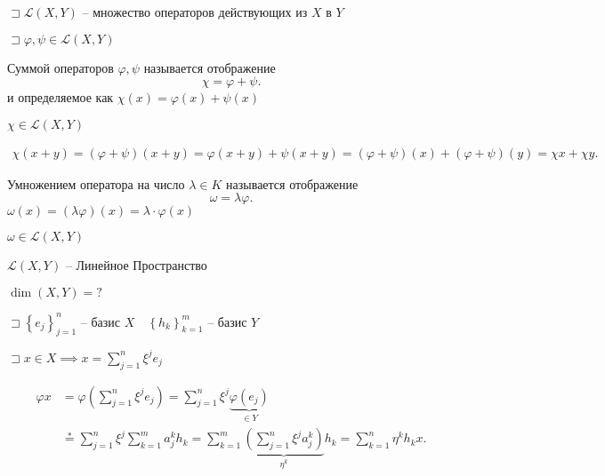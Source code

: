 \documentclass{book}
\theoremstyle{definition}
\begin{document}
$\sqsupset \mathscr{L}(X,Y)$ -- множество операторов действующих из $X$ в  $Y$

$\sqsupset \varphi, \psi \in \mathscr{L}(X, Y)$

\begin{definition}
    Суммой операторов $\varphi, \psi$ называется отображение  \[
    \chi = \varphi + \psi
    .\] 
    и определяемое как $\chi(x) = \varphi(x) + \psi(x)$
\end{definition}
\begin{lemma}
    $\chi \in \mathscr{L}(X, Y)$

     \begin{align*}
         \chi(x+y) = (\varphi + \psi)(x+y) = \varphi(x+y) + \psi(x+y) = (\varphi + \psi)(x) + (\varphi + \psi)(y) = \chi x + \chi y
    .\end{align*}
\end{lemma}

\begin{definition}
    Умножением оператора на число $\lambda \in K$ называется отображение
     \[
    \omega = \lambda \varphi
    .\] 
    $\omega(x) = \left( \lambda \varphi \right) (x) = \lambda\cdot  \varphi(x)$
\end{definition}
\begin{lemma}
    $\omega\in\mathscr{L}(X, Y)$
\end{lemma}

\begin{theorem}
    $\mathscr{L}(X, Y)$ -- Линейное Пространство
\end{theorem}

\begin{question}
    $\dim(X, Y) = ?$
    
\end{question}

$\sqsupset \left\{ e_j \right\} _{j=1}^n$ -- базис $X\quad \left\{ h_k \right\} _{k=1}^m$ -- базис $Y$

$\sqsupset x\in X \implies x = \sum_{j=1}^{n} \xi^je_j$ 

\begin{align*}
    \varphi x &= \varphi\left( \sum_{j=1}^{n} \xi^je_j \right)  
               =\sum_{j=1}^{n} \xi^j\underbrace{\varphi(e_j)}_{\in Y} \\
              &\overset * = \sum_{j=1}^{n} \xi^j \sum_{k=1}^{m} a_j^kh_k 
              = \sum_{k=1}^{m}\underbrace{ \left( \sum_{j=1}^{n} \xi^ja_j^k \right)}_{\eta^k} h_k
              = \sum_{k=1}^{n} \eta^kh_kx
.\end{align*}
\end{document}
